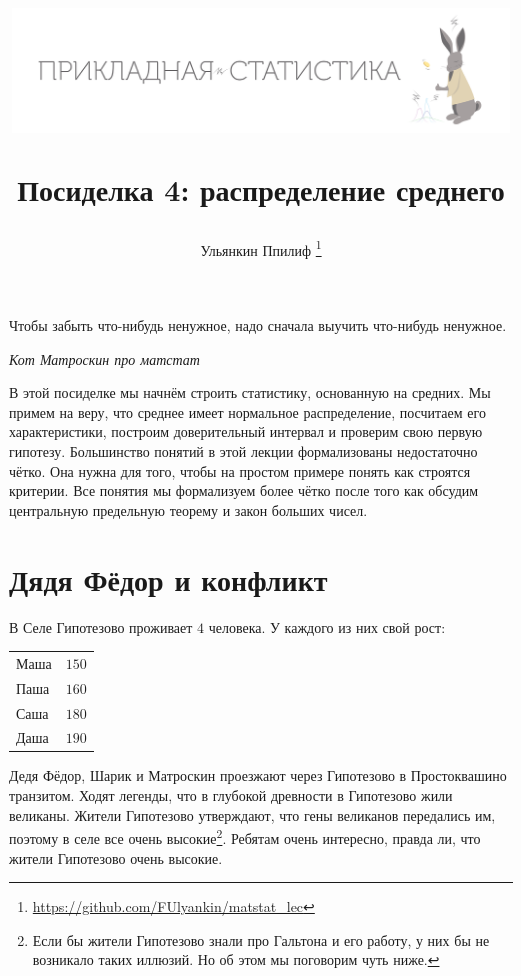 \documentclass[12pt, a4paper, oneside]{article}
\title{
\begin{center} 
\includegraphics[width=0.99\textwidth]{logo.png}
\end{center}

Посиделка 4: распределение среднего}
\date{ } %
\author{Ульянкин Ппилиф \thanks{\url{https://github.com/FUlyankin/matstat_lec}}}
\begin{document}

\maketitle

\epigraph{Чтобы забыть что-нибудь ненужное, надо сначала выучить что-нибудь ненужное.}{\textit{Кот Матроскин про матстат}}

В этой посиделке мы начнём строить статистику, основанную на средних. Мы примем на веру, что среднее имеет нормальное распределение, посчитаем его характеристики, построим доверительный интервал и проверим свою первую гипотезу. Большинство понятий в этой лекции формализованы недостаточно чётко. Она нужна для того, чтобы на простом примере понять как строятся критерии. Все понятия мы формализуем более чётко после того как обсудим центральную предельную теорему и закон больших чисел. 

\section{Дядя Фёдор и конфликт}

В Селе  Гипотезово проживает $4$ человека. У каждого из них свой рост:

\begin{center}
	\begin{tabular}{lc}
		\toprule
		Маша &  $150$\\
		Паша &  $160$\\
		Саша &  $180$\\
		Даша &  $190$\\ 
		\bottomrule
	\end{tabular}	
\end{center}

Дедя Фёдор, Шарик и Матроскин проезжают через Гипотезово в Простоквашино транзитом. Ходят легенды, что в глубокой древности в Гипотезово жили великаны. Жители Гипотезово утверждают, что гены великанов передались им, поэтому в селе все очень высокие\footnote{Если бы жители Гипотезово знали про Гальтона и его работу, у них бы не возникало таких иллюзий. Но об этом мы поговорим чуть ниже.}. Ребятам очень интересно, правда ли, что жители Гипотезово очень высокие.
\end{document}
